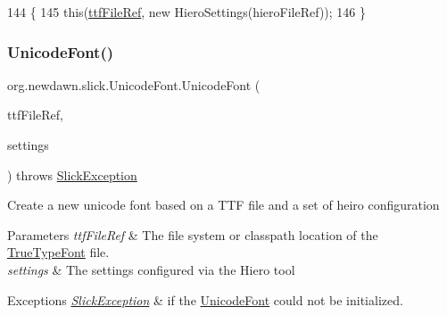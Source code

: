\begin{DoxyCode}
144                                                                                       \{
145         \textcolor{keyword}{this}(\mbox{\hyperlink{classorg_1_1newdawn_1_1slick_1_1_unicode_font_a2f13dde71bdabcab77c49030a4af17f2}{ttfFileRef}}, \textcolor{keyword}{new} HieroSettings(hieroFileRef));
146     \}
\end{DoxyCode}
\mbox{\label{classorg_1_1newdawn_1_1slick_1_1_unicode_font_ae27fb59e09fc918fef115481089debf5}} 
\subsubsection{\texorpdfstring{Unicode\+Font()}{UnicodeFont()}\hspace{0.1cm}{\footnotesize\ttfamily [2/7]}}
{\footnotesize\ttfamily org.\+newdawn.\+slick.\+Unicode\+Font.\+Unicode\+Font (\begin{DoxyParamCaption}\item[{String}]{ttf\+File\+Ref,  }\item[{\mbox{\hyperlink{classorg_1_1newdawn_1_1slick_1_1font_1_1_hiero_settings}{Hiero\+Settings}}}]{settings }\end{DoxyParamCaption}) throws \mbox{\hyperlink{classorg_1_1newdawn_1_1slick_1_1_slick_exception}{Slick\+Exception}}\hspace{0.3cm}{\ttfamily [inline]}}

Create a new unicode font based on a T\+TF file and a set of heiro configuration


\begin{DoxyParams}{Parameters}
{\em ttf\+File\+Ref} & The file system or classpath location of the \mbox{\hyperlink{classorg_1_1newdawn_1_1slick_1_1_true_type_font}{True\+Type\+Font}} file. \\
\hline
{\em settings} & The settings configured via the Hiero tool \\
\hline
\end{DoxyParams}

\begin{DoxyExceptions}{Exceptions}
{\em \mbox{\hyperlink{classorg_1_1newdawn_1_1slick_1_1_slick_exception}{Slick\+Exception}}} & if the \mbox{\hyperlink{classorg_1_1newdawn_1_1slick_1_1_unicode_font}{Unicode\+Font}} could not be initialized. \\
\hline
\end{DoxyExceptions}

